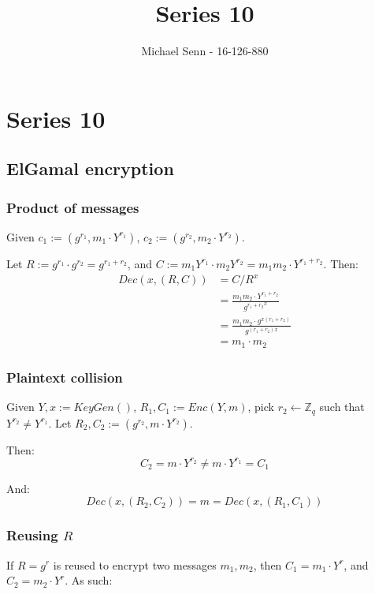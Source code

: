 \documentclass[a4paper]{scrreprt}
\title{Series 10}
\author{Michael Senn \maillink{michael.senn@students.unibe.ch} - 16-126-880}
\date{\printdate}
\begin{document}
\maketitle


\setcounter{chapter}{9}
\chapter{Series 10}

\section{ElGamal encryption}


\subsection{Product of messages}

Given $c_1 := (g^{r_1}, m_1 \cdot Y^{r_1})$, $c_2 := (g^{r_2}, m_2 \cdot
Y^{r_2})$. 

Let $R := g^{r_1} \cdot g^{r_2} = g^{r_1 + r_2}$, and $C := m_1 Y^{r_1} \cdot
m_2 Y^{r_2} = m_1 m_2 \cdot Y^{r_1 + r_2}$. Then:
\begin{align*}
  Dec(x, (R, C)) & = C / R^x \\
                 & = \frac{m_1 m_2 \cdot Y^{r_1 + r_2}}{{g^{r_1 + r_2}}^{x}} \\
                 & = \frac{m_1 m_2 \cdot g^{x (r_1 + r_2)}}{g^{(r_1 + r_2)x}} \\
                 & = m_1 \cdot m_2
\end{align*}

\subsection{Plaintext collision}

Given $Y, x := KeyGen()$, $R_1, C_1 := Enc(Y, m)$, pick $r_2 \leftarrow
\mathbb{Z}_q$ such that $Y^{r_2} \neq Y^{r_1}$. Let $R_2, C_2 := (g^{r_2}, m \cdot
Y^{r_2})$.

Then:
\[
  C_2 = m \cdot Y^{r_2} \neq m \cdot Y^{r_1} = C_1
\]

And:
\[
  Dec(x, (R_2, C_2)) = m = Dec(x, (R_1, C_1))
\]

\subsection{Reusing $R$}

If $R = g^r$ is reused to encrypt two messages $m_1, m_2$, then $C_1 = m_1
\cdot Y^r$, and $C_2 = m_2 \cdot Y^r$. As such:
\end{document}
